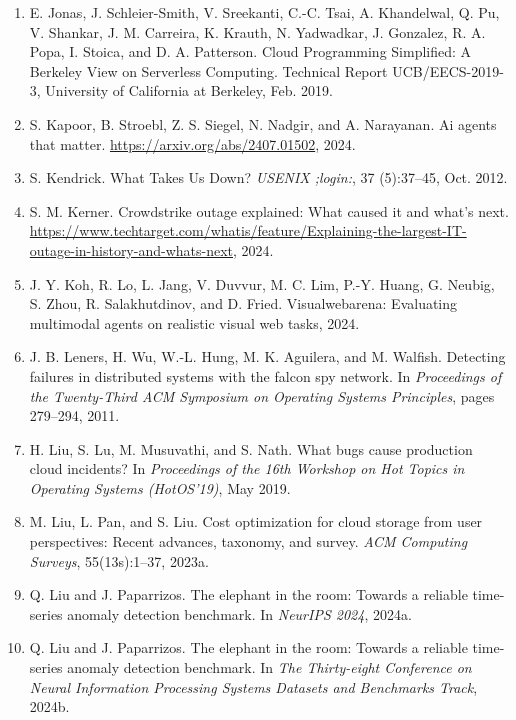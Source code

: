 \documentclass[10pt,UTF8,fontset=fandol]{ctexart}
\begin{document}
\begin{enumerate}[leftmargin=2em,itemsep=2pt]
\item E. Jonas, J. Schleier-Smith, V. Sreekanti, C.-C. Tsai, A. Khandelwal, Q. Pu, V. Shankar, J. M. Carreira, K. Krauth, N. Yadwadkar, J. Gonzalez, R. A. Popa, I. Stoica, and D. A. Patterson. Cloud Programming Simplified: A Berkeley View on Serverless Computing. Technical Report UCB/EECS-2019-3, University of California at Berkeley, Feb. 2019.

\item S. Kapoor, B. Stroebl, Z. S. Siegel, N. Nadgir, and A. Narayanan. Ai agents that matter. \url{https://arxiv.org/abs/2407.01502}, 2024.

\item S. Kendrick. What Takes Us Down? \textit{USENIX ;login:}, 37 (5):37--45, Oct. 2012.

\item S. M. Kerner. Crowdstrike outage explained: What caused it and what's next. \url{https://www.techtarget.com/whatis/feature/Explaining-the-largest-IT-outage-in-history-and-whats-next}, 2024.

\item J. Y. Koh, R. Lo, L. Jang, V. Duvvur, M. C. Lim, P.-Y. Huang, G. Neubig, S. Zhou, R. Salakhutdinov, and D. Fried. Visualwebarena: Evaluating multimodal agents on realistic visual web tasks, 2024.

\item J. B. Leners, H. Wu, W.-L. Hung, M. K. Aguilera, and M. Walfish. Detecting failures in distributed systems with the falcon spy network. In \textit{Proceedings of the Twenty-Third ACM Symposium on Operating Systems Principles}, pages 279--294, 2011.

\item H. Liu, S. Lu, M. Musuvathi, and S. Nath. What bugs cause production cloud incidents? In \textit{Proceedings of the 16th Workshop on Hot Topics in Operating Systems (HotOS'19)}, May 2019.

\item M. Liu, L. Pan, and S. Liu. Cost optimization for cloud storage from user perspectives: Recent advances, taxonomy, and survey. \textit{ACM Computing Surveys}, 55(13s):1--37, 2023a.

\item Q. Liu and J. Paparrizos. The elephant in the room: Towards a reliable time-series anomaly detection benchmark. In \textit{NeurIPS 2024}, 2024a.

\item Q. Liu and J. Paparrizos. The elephant in the room: Towards a reliable time-series anomaly detection benchmark. In \textit{The Thirty-eight Conference on Neural Information Processing Systems Datasets and Benchmarks Track}, 2024b.


\end{enumerate}
\end{document}
